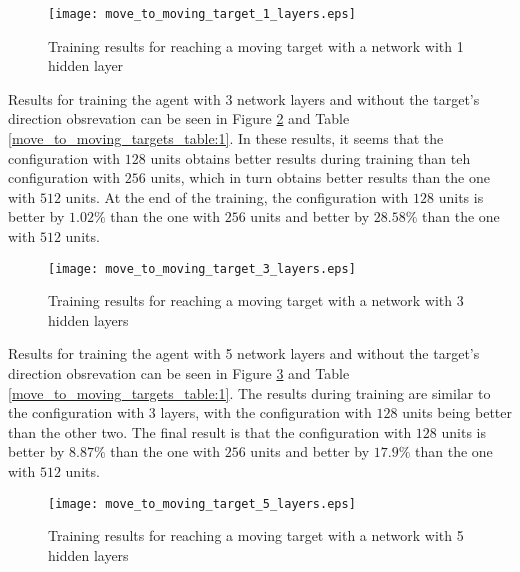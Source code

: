\begin{figure}
    \begin{center}
        \texttt{[image: move\_to\_moving\_target\_1\_layers.eps]}
        \caption{Training results for reaching a moving target with a network with 1 hidden layer}
        \label{train_results_moving_1_layers}
    \end{center}
\end{figure}


Results for training the agent with 3 network layers and without the target's direction obsrevation can be seen in Figure \ref{train_results_moving_3_layers} and Table \ref{move_to_moving_targets_table:1}. In these results, it seems that the configuration with $128$ units obtains better results during training than teh configuration with $256$ units, which in turn obtains better results than the one with $512$ units. At the end of the training, the configuration with $128$ units is better by $1.02\%$ than the one with $256$ units and better by $28.58\%$ than the one with $512$ units.

\begin{figure}
    \begin{center}
        \texttt{[image: move\_to\_moving\_target\_3\_layers.eps]}
        \caption{Training results for reaching a moving target with a network with 3 hidden layers}
        \label{train_results_moving_3_layers}
    \end{center}
\end{figure}


Results for training the agent with 5 network layers and without the target's direction obsrevation can be seen in Figure \ref{train_results_moving_5_layers} and Table \ref{move_to_moving_targets_table:1}. The results during training are similar to the configuration with 3 layers, with the configuration with $128$ units being better than the other two. The final result is that the configuration with $128$ units is better by $8.87\%$ than the one with $256$ units and better by $17.9\%$ than the one with $512$ units.

\begin{figure}
    \begin{center}
        \texttt{[image: move\_to\_moving\_target\_5\_layers.eps]}
        \caption{Training results for reaching a moving target with a network with 5 hidden layers}
        \label{train_results_moving_5_layers}
    \end{center}
\end{figure}


